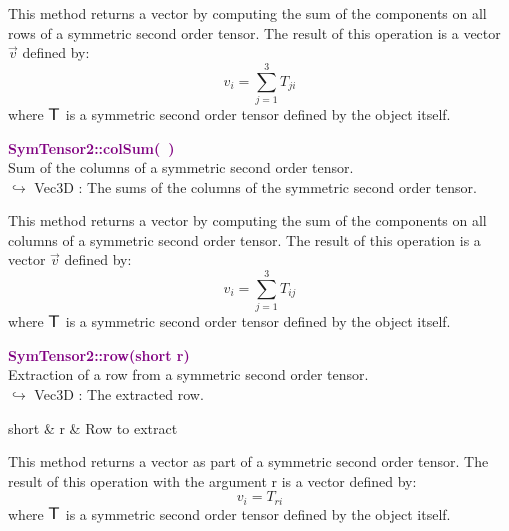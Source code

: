 This method returns a vector by computing the sum of the components on all rows of a symmetric second order tensor.
The result of this operation is a vector $\overrightarrow{v}$ defined by:
\begin{equation*}
v_{i}=\sum_{j=1}^{3} T_{ji}
\end{equation*}
where $\mbox{\large\ensuremath{\mathsf{T}}}$ is a symmetric second order tensor defined by the object itself.

\textcolor{purple}{\textbf{SymTensor2::colSum(~)}}\label{SymTensor2::colSum()}\\
Sum of the columns of a symmetric second order tensor.\\ \hspace*{10mm}$\hookrightarrow$ Vec3D : The sums of the columns of the symmetric second order tensor.

This method returns a vector by computing the sum of the components on all columns of a symmetric second order tensor.
The result of this operation is a vector $\overrightarrow{v}$ defined by:
\begin{equation*}
v_{i}=\sum_{j=1}^{3}T_{ij}
\end{equation*}
where $\mbox{\large\ensuremath{\mathsf{T}}}$ is a symmetric second order tensor defined by the object itself.

\textcolor{purple}{\textbf{SymTensor2::row(short r)}}\label{SymTensor2::row(short r)}\\
Extraction of a row from a symmetric second order tensor.\\ \hspace*{10mm}$\hookrightarrow$ Vec3D : The extracted row.

\begin{tcolorbox}[width=\textwidth,myArgs,tabularx={ll|R}]
short & r & Row to extract
\end{tcolorbox}

This method returns a vector as part of a symmetric second order tensor.
The result of this operation with the argument r is a vector defined by:
\begin{equation*}
v_{i} = T_{ri}
\end{equation*}
where $\mbox{\large\ensuremath{\mathsf{T}}}$ is a symmetric second order tensor defined by the object itself.

